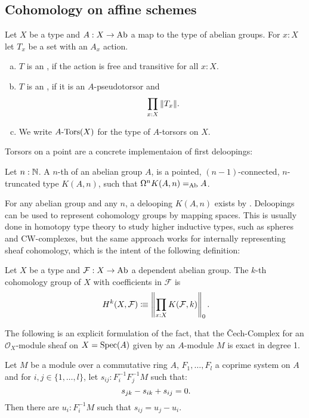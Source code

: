 \subsection{Cohomology on affine schemes}

\begin{definition}%
  \label{torsor}
  Let $X$ be a type and $A:X\to \operatorname{Ab}$ a map to the type of abelian groups.
  For $x:X$ let $T_x$ be a set with an $A_x$ action.
  \begin{enumerate}[(a)]
  \item $T$ is an , if the action is free and transitive for all $x:X$.
  \item $T$ is an , if it is an $A$-pseudotorsor and
    \[ \prod_{x:X} \| T_x \| \rlap{.}\]
  \item We write $A\text{-}\mathrm{Tors}(X)$ for the type of $A$-torsors on $X$.
  \end{enumerate}
\end{definition}

Torsors on a point are a concrete implementaion of first deloopings:

\begin{definition}
  \label{delooping}
  Let $n:\mathbb{N}$.
  A $n$-th  of an abelian group $A$,
  is a pointed, $(n-1)$-connected, $n$-truncated type $K(A,n)$,
  such that $\Omega^nK(A,n)=_{\operatorname{Ab}}A$.
\end{definition}

For any abelian group and any $n$, a delooping $K(A,n)$ exists by \cite{licata-finster}.
Deloopings can be used to represent cohomology groups by mapping spaces.
This is usually done in homotopy type theory to study higher inductive types, such as spheres and CW-complexes,
but the same approach works for internally representing sheaf cohomology,
which is the intent of the following definition:

\begin{definition}
  \label{cohomology}
  Let $X$ be a type and $\mathcal F:X\to\operatorname{Ab}$ a dependent abelian group.
  The $k$-th cohomology group of $X$ with coefficients in $\mathcal F$ is
  \[
    H^k(X,\mathcal F)\colonequiv \left\|\prod_{x:X}K(\mathcal F,k)\right\|_0\rlap{.}
  \]
\end{definition}


The following is an explicit formulation of the fact, that the Čech-Complex for an
$\mathcal{O}_X$-module sheaf on $X=\operatorname{Spec}(A)$ given by an $A$-module $M$ is exact in degree 1.
\begin{lemma}%
  \label{H1-algebra}
  Let $M$ be a module over a commutative ring $A$, $F_1,\dots,F_l$ a coprime system on $A$
  and for $i,j\in\{1,\dots,l\}$, let $s_{ij} : F_i^{-1} F_j^{-1} M$ such that:
  \[ s_{jk}-s_{ik}+s_{ij}=0 \rlap{.}\]
  Then there are $u_i:F_i^{-1}M$ such that $s_{ij}=u_j - u_i$.
\end{lemma}

